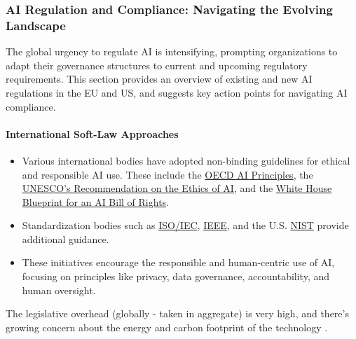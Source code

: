 \subsubsection{AI Regulation and Compliance: Navigating the Evolving Landscape}

The global urgency to regulate AI is intensifying, prompting organizations to adapt their governance structures to current and upcoming regulatory requirements. This section provides an overview of existing and new AI regulations in the EU and US, and suggests key action points for navigating AI compliance.

\paragraph{International Soft-Law Approaches}
\begin{itemize}
\item Various international bodies have adopted non-binding guidelines for ethical and responsible AI use. These include the \href{https://oecd.ai/en/ai-principles}{OECD AI Principles}, the \href{https://www.unesco.org/en/artificial-intelligence/recommendation-ethics}{UNESCO’s Recommendation on the Ethics of AI}, and the \href{https://www.whitehouse.gov/ostp/ai-bill-of-rights/}{White House Blueprint for an AI Bill of Rights}.
\item Standardization bodies such as \href{https://www.iso.org/standard/77608.html}{ISO/IEC}, \href{https://standards.ieee.org/initiatives/autonomous-intelligence-systems/}{IEEE}, and the U.S. \href{https://nvlpubs.nist.gov/nistpubs/ai/NIST.AI.100-1.pdf}{NIST} provide additional guidance.
\item These initiatives encourage the responsible and human-centric use of AI, focusing on principles like privacy, data governance, accountability, and human oversight.
\end{itemize}

The legislative overhead (globally - taken in aggregate) is very high, and there's growing concern about the energy and carbon footprint of the technology \cite{wu2022sustainable}. 


